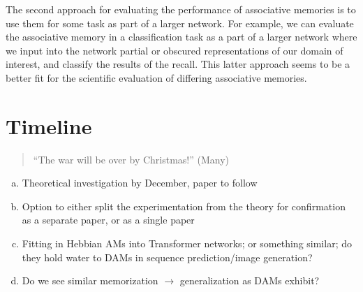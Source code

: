 \documentclass{article}
\theoremstyle{definition}
\begin{document}
The second approach for evaluating the performance of associative memories
is to use them for some task as part of a larger network. For example, we can
evaluate the associative memory in a classification task as a part of
a larger network where we input into the network partial or obscured
representations of our domain of interest, and classify the results of the
recall. This latter approach seems to be a better fit for the scientific
evaluation of differing associative memories.

\section{Timeline}

\begin{quote}
  ``The war will be over by Christmas!'' (Many)
\end{quote}

\begin{enumerate}[(a)]
  \item Theoretical investigation by December, paper to follow
  \item Option to either split the experimentation from the theory
    for confirmation as a separate
    paper, or as a single paper
  \item Fitting in Hebbian AMs into Transformer networks; or
    something similar; do they hold
    water to DAMs in sequence prediction/image generation?
  \item Do we see similar memorization $\to$ generalization as DAMs exhibit?
\end{enumerate}

\printbibliography
\end{document}
